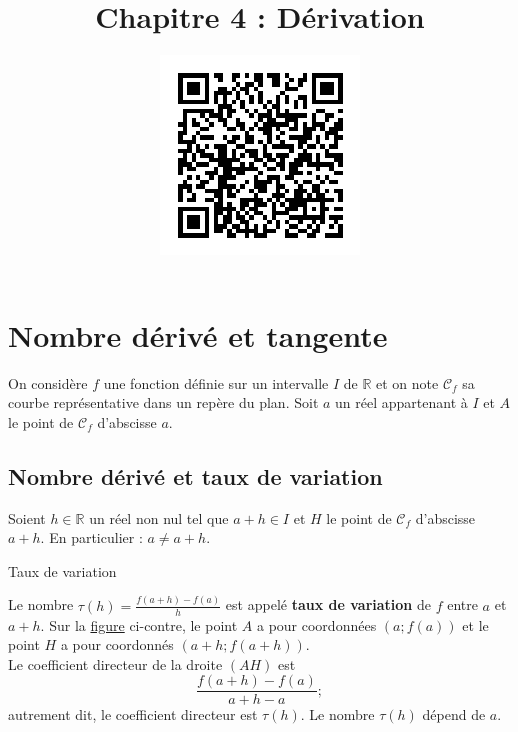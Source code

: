 \documentclass[11pt]{article}
\title{\vspace{-10mm}Chapitre 4 : Dérivation}
\date{\vspace{-14mm}
\href{https://erou.forge.aeif.fr/s11/information.html}{
  \includegraphics[scale=.6]{qrderivation.png}}
\vspace{-12mm}}
\author{}
\begin{document}
\maketitle\thispagestyle{fancy}

\newcommand{\Cf}{\mathscr{C}_f}

\section{Nombre dérivé et tangente}
\noindent On considère $f$ une fonction définie sur un intervalle $I$ de $\mathbb{R}$ et
on note $\Cf$ sa courbe représentative dans un repère du plan. Soit $a$ un réel
appartenant à $I$ et $A$ le point de $\Cf$ d'abscisse $a$.

\subsection{Nombre dérivé et taux de variation}
\noindent Soient $h\in\mathbb{R}$ un réel non nul tel que $a+h\in I$ et $H$ le point de
$\Cf$ d'abscisse $a+h$. En particulier : $a\neq a+h$. 
\begin{defi}{Taux de variation}
  \begin{minipage}{.6\textwidth}
    Le nombre $\tau(h) =\frac{f(a+h)-f(a)}{h}$ est appelé \textbf{taux de
    variation} de $f$ entre $a$ et $a+h$. Sur la
    \href{https://www.geogebra.org/m/bj5pnzvr}{figure} ci-contre,
    le point $A$ a pour coordonnées $(a; f(a))$ et le point $H$ a pour coordonnés
    $(a+h; f(a+h))$.\\
    Le coefficient directeur de la droite $(AH)$ est
    \[
      \frac{f(a+h)-f(a)}{a+h-a};
    \]
    autrement dit, le coefficient directeur est $\tau(h)$. Le nombre $\tau(h)$
    dépend de $a$.
  \end{minipage}
  \begin{minipage}{.4\textwidth}
    \begin{center}
    \end{center}
  \end{minipage}
\end{defi}
\end{document}
